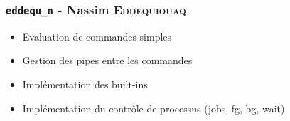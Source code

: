 \subsubsection{\texttt{eddequ\_n} - Nassim \textsc{Eddequiouaq}}

\begin{itemize}
    \item Evaluation de commandes simples
    \item Gestion des pipes entre les commandes
    \item Implémentation des built-ins
    \item Implémentation du contrôle de processus (jobs, fg, bg, wait)
\end{itemize}
